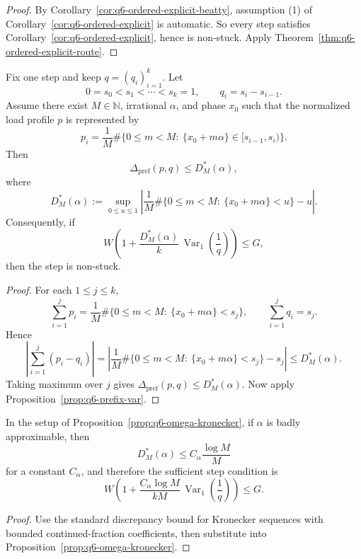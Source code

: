 \begin{proof}
By Corollary~\ref{cor:q6-ordered-explicit-beatty},
assumption (1) of Corollary~\ref{cor:q6-ordered-explicit} is automatic.
So every step satisfies Corollary~\ref{cor:q6-ordered-explicit}, hence is
non-stuck. Apply Theorem~\ref{thm:q6-ordered-explicit-route}.
\end{proof}

\begin{proposition}\label{prop:q6-omega-kronecker}
Fix one step and keep $q=(q_i)_{i=1}^k$.
Let
\[
0=s_0<s_1<\cdots<s_k=1,\qquad q_i=s_i-s_{i-1}.
\]
Assume there exist $M\in\mathbb N$, irrational $\alpha$, and phase $x_0$
such that the normalized load profile $p$ is represented by
\[
p_i=\frac1M\#\{0\le m<M:\ \{x_0+m\alpha\}\in [s_{i-1},s_i)\}.
\]
Then
\[
\Delta_{\mathrm{pref}}(p,q)\le D_M^*(\alpha),
\]
where
\[
D_M^*(\alpha):=
\sup_{0\le u\le 1}
\left|
\frac1M\#\{0\le m<M:\ \{x_0+m\alpha\}<u\}-u
\right|.
\]
Consequently, if
\[
W\left(1+\frac{D_M^*(\alpha)}{k}\,
\operatorname{Var}_1\!\left(\frac1q\right)\right)\le G,
\]
then the step is non-stuck.
\end{proposition}

\begin{proof}
For each $1\le j\le k$,
\[
\sum_{i=1}^j p_i
=
\frac1M\#\{0\le m<M:\ \{x_0+m\alpha\}<s_j\},
\qquad
\sum_{i=1}^j q_i=s_j.
\]
Hence
\[
\left|\sum_{i=1}^j(p_i-q_i)\right|
=
\left|
\frac1M\#\{0\le m<M:\ \{x_0+m\alpha\}<s_j\}-s_j
\right|
\le D_M^*(\alpha).
\]
Taking maximum over $j$ gives
\(\Delta_{\mathrm{pref}}(p,q)\le D_M^*(\alpha)\).
Now apply Proposition~\ref{prop:q6-prefix-var}.
\end{proof}

\begin{corollary}\label{cor:q6-omega-ba}
In the setup of Proposition~\ref{prop:q6-omega-kronecker}, if
\(\alpha\) is badly approximable, then
\[
D_M^*(\alpha)\le C_\alpha\frac{\log M}{M}
\]
for a constant \(C_\alpha\), and therefore the sufficient step condition is
\[
W\left(1+\frac{C_\alpha\log M}{kM}\,
\operatorname{Var}_1\!\left(\frac1q\right)\right)\le G.
\]
\end{corollary}

\begin{proof}
Use the standard discrepancy bound for Kronecker sequences with bounded
continued-fraction coefficients, then substitute into
Proposition~\ref{prop:q6-omega-kronecker}.
\end{proof}

